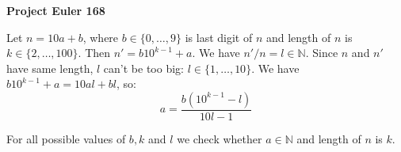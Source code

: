 \documentclass[a4paper,12pt]{article}
\begin{document}
\setlength\parindent{0pt}
\textbf{Project Euler 168}
\vspace{5ex}

Let \(n = 10a + b\), where \(b \in \{0, \dots, 9\}\) is last digit of \(n\) and length of \(n\) is \(k \in \{2, \dots, 100\}\). Then \(n' = b 10^{k - 1} + a\). We have \(n'/n = l \in \mathbb{N}\). Since \(n\) and \(n'\) have same length, \(l\) can't be too big: \(l \in \{1, \dots, 10\}\). We have \(b 10^{k - 1} + a = 10 a l + b l\), so:
\[a = \frac{b (10^{k - 1} - l)}{10 l - 1}\]

For all possible values of \(b, k\) and \(l\) we check whether \(a \in \mathbb{N}\) and length of \(n\) is \(k\). 
\end{document}
